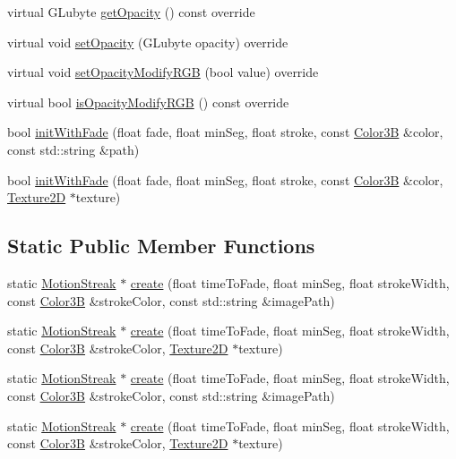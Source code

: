 \begin{DoxyCompactItemize}
virtual G\+Lubyte \hyperlink{classMotionStreak_a7e7bfd8eb37092a0477b2c1012e179c2}{get\+Opacity} () const override
\item 
virtual void \hyperlink{classMotionStreak_af5d9d6c438239621c6931d312a92fcec}{set\+Opacity} (G\+Lubyte opacity) override
\item 
virtual void \hyperlink{classMotionStreak_a03e92253595f528d79528bbb4be1b2ad}{set\+Opacity\+Modify\+R\+GB} (bool value) override
\item 
virtual bool \hyperlink{classMotionStreak_a74c2b98555067ccd7d069273f9569aba}{is\+Opacity\+Modify\+R\+GB} () const override
\item 
bool \hyperlink{classMotionStreak_a2691831b200b8426ed8bf6d0dfd688d9}{init\+With\+Fade} (float fade, float min\+Seg, float stroke, const \hyperlink{structColor3B}{Color3B} \&color, const std\+::string \&path)
\item 
bool \hyperlink{classMotionStreak_a5905898a3f71dad4c4582988556878a4}{init\+With\+Fade} (float fade, float min\+Seg, float stroke, const \hyperlink{structColor3B}{Color3B} \&color, \hyperlink{classTexture2D}{Texture2D} $\ast$texture)
\end{DoxyCompactItemize}
\subsection*{Static Public Member Functions}
\begin{DoxyCompactItemize}
\item 
static \hyperlink{classMotionStreak}{Motion\+Streak} $\ast$ \hyperlink{classMotionStreak_aa8d7172cc57dc5cee559fa6bc35cfa48}{create} (float time\+To\+Fade, float min\+Seg, float stroke\+Width, const \hyperlink{structColor3B}{Color3B} \&stroke\+Color, const std\+::string \&image\+Path)
\item 
static \hyperlink{classMotionStreak}{Motion\+Streak} $\ast$ \hyperlink{classMotionStreak_a8e64bd804c4d6938f501e4c91beafd0a}{create} (float time\+To\+Fade, float min\+Seg, float stroke\+Width, const \hyperlink{structColor3B}{Color3B} \&stroke\+Color, \hyperlink{classTexture2D}{Texture2D} $\ast$texture)
\item 
static \hyperlink{classMotionStreak}{Motion\+Streak} $\ast$ \hyperlink{classMotionStreak_a84ed74834fa2831a36705ff85751c991}{create} (float time\+To\+Fade, float min\+Seg, float stroke\+Width, const \hyperlink{structColor3B}{Color3B} \&stroke\+Color, const std\+::string \&image\+Path)
\item 
static \hyperlink{classMotionStreak}{Motion\+Streak} $\ast$ \hyperlink{classMotionStreak_a452a9ed28b3e7ba0230f50d21e287c07}{create} (float time\+To\+Fade, float min\+Seg, float stroke\+Width, const \hyperlink{structColor3B}{Color3B} \&stroke\+Color, \hyperlink{classTexture2D}{Texture2D} $\ast$texture)
\end{DoxyCompactItemize}
